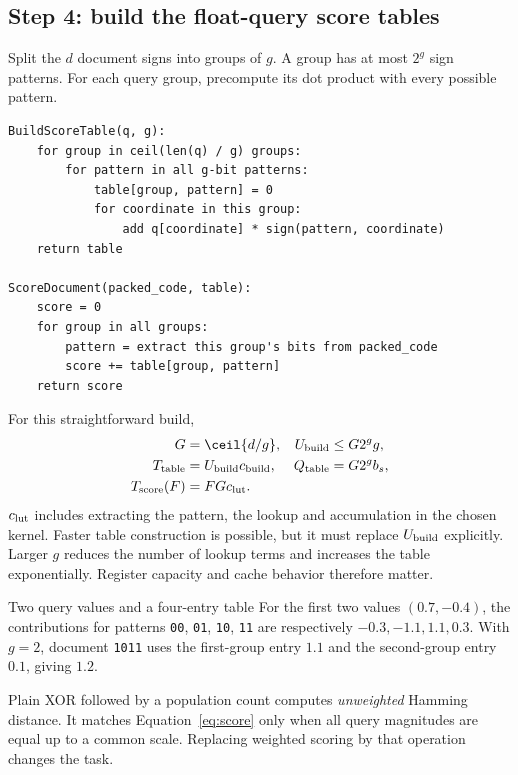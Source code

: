 \subsection{Step 4: build the float-query score tables}
Split the $d$ document signs into groups of $g$. A group has at most $2^g$ sign patterns.
For each query group, precompute its dot product with every possible pattern.
\par\noindent\begin{minipage}{\linewidth}
\begin{lstlisting}[caption={The score table. Padding contributes zero in the last group.}]
BuildScoreTable(q, g):
    for group in ceil(len(q) / g) groups:
        for pattern in all g-bit patterns:
            table[group, pattern] = 0
            for coordinate in this group:
                add q[coordinate] * sign(pattern, coordinate)
    return table

ScoreDocument(packed_code, table):
    score = 0
    for group in all groups:
        pattern = extract this group's bits from packed_code
        score += table[group, pattern]
    return score
\end{lstlisting}
\end{minipage}\par
For this straightforward build,
\begin{align}
G&=\ceil{d/g}, & U_{\rm build}&\leq G2^g g,\\
T_{\rm table}&=U_{\rm build}c_{\rm build}, & Q_{\rm table}&=G2^g b_s,\\
T_{\rm score}(F)&=F G c_{\rm lut}.&&
\label{eq:lut}
\end{align}
$c_{\rm lut}$ includes extracting the pattern, the lookup and accumulation in the chosen
kernel. Faster table construction is possible, but it must replace $U_{\rm build}$ explicitly.
Larger $g$ reduces the number of lookup terms and increases the table exponentially. Register
capacity and cache behavior therefore matter.

\begin{examplebox}{Two query values and a four-entry table}
For the first two values $(0.7,-0.4)$, the contributions for patterns
\texttt{00}, \texttt{01}, \texttt{10}, \texttt{11} are respectively
$-0.3,-1.1,1.1,0.3$. With $g=2$, document \texttt{1011} uses the first-group entry
$1.1$ and the second-group entry $0.1$, giving $1.2$.
\end{examplebox}

Plain XOR followed by a population count computes \emph{unweighted} Hamming distance. It
matches Equation~\eqref{eq:score} only when all query magnitudes are equal up to a common
scale. Replacing weighted scoring by that operation changes the task.

